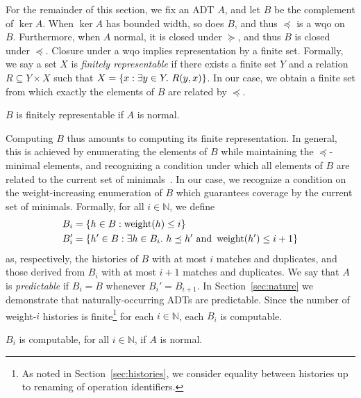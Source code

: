 For the remainder of this section, we fix an ADT $A$, and let $B$ be the
complement of $\ker A$. When $\ker A$ has bounded width, so does $B$, and thus
$\preceq$ is a wqo on $B$. Furthermore, when $A$ normal, it is closed under
$\succeq$, and thus $B$ is closed under $\preceq$. Closure under a wqo implies
representation by a finite set. Formally, we say a set $X$ is \emph{finitely
representable} if there exists a finite set $Y$ and a relation $R \subseteq Y
\times X$ such that $X = {\{{ x : \exists y\in Y.\ R(y,x) }\}}$. In our case, we
obtain a finite set from which exactly the elements of $B$ are related by
$\preceq$.

\begin{lemma}

  $B$ is finitely representable if $A$ is normal.

\end{lemma}

Computing $B$ thus amounts to computing its finite representation. In general,
this is achieved by enumerating the elements of $B$ while maintaining the
$\preceq$-minimal elements, and recognizing a condition under which all
elements of $B$ are related to the current set of
minimals~\cite{conf/lics/AbdullaCJT96, journals/tcs/FinkelS01}. In our case, we
recognize a condition on the weight-increasing enumeration of $B$ which
guarantees coverage by the current set of minimals. Formally, for all $i \in
\mathbb{N}$, we define
\begin{align*}
  B_i &= {\{{ h \in B : \operatorname{weight}(h) \le i }\}} \\
  B_i' &= {\{{ h' \in B :
    \exists h \in B_i.\ h \preceq h' \text{ and } \operatorname{weight}(h') \le i+1
  }\}}
\end{align*}
as, respectively, the histories of $B$ with at most $i$ matches and duplicates,
and those derived from $B_i$ with at most $i\!+\!1$ matches and duplicates. We
say that $A$ is \emph{predictable} if $B_i = B$ whenever $B_i' = B_{i+1}$. In
Section~\ref{sec:nature} we demonstrate that naturally-occurring ADTs are
predictable. Since the number of weight-$i$ histories is finite\footnote{As
noted in Section~\ref{sec:histories}, we consider equality between histories up
to renaming of operation identifiers.} for each $i \in \mathbb{N}$, each $B_i$
is computable.

\begin{lemma}

  $B_i$ is computable, for all $i \in \mathbb{N}$, if $A$ is normal.

\end{lemma}

